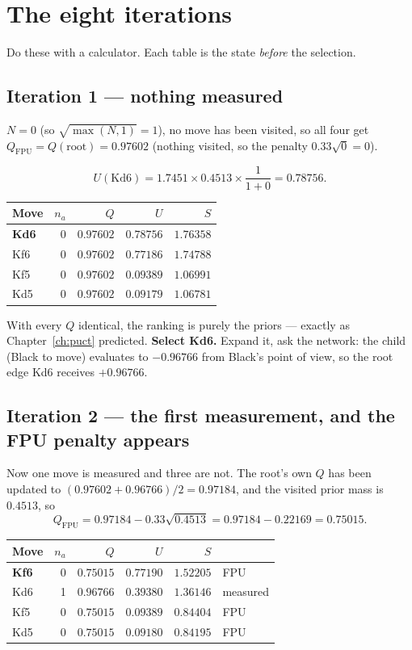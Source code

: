 \section{The eight iterations}

Do these with a calculator. Each table is the state \emph{before} the selection.

\subsection*{Iteration 1 --- nothing measured}

$N = 0$ (so $\sqrt{\max(N,1)} = 1$), no move has been visited, so all four get
$Q_{\text{FPU}} = Q(\text{root}) = 0.97602$ (nothing visited, so the penalty
$0.33\sqrt{0} = 0$).

\[
  U(\text{Kd6}) = 1.7451 \times 0.4513 \times \frac{1}{1+0} = 0.78756 .
\]

\begin{center}
\begin{tabular}{@{}lrrrr@{}}
\toprule
Move & $n_a$ & $Q$ & $U$ & $S$ \\
\midrule
\textbf{Kd6} & 0 & $0.97602$ & $0.78756$ & $\mathbf{1.76358}$ \\
Kf6 & 0 & $0.97602$ & $0.77186$ & $1.74788$ \\
Kf5 & 0 & $0.97602$ & $0.09389$ & $1.06991$ \\
Kd5 & 0 & $0.97602$ & $0.09179$ & $1.06781$ \\
\bottomrule
\end{tabular}
\end{center}

With every $Q$ identical, the ranking is purely the priors --- exactly as
Chapter~\ref{ch:puct} predicted. \textbf{Select Kd6.} Expand it, ask the network:
the child (Black to move) evaluates to $-0.96766$ from Black's point of view, so the root
edge Kd6 receives $+0.96766$.

\subsection*{Iteration 2 --- the first measurement, and the FPU penalty appears}

Now one move is measured and three are not. The root's own $Q$ has been updated to
$(0.97602 + 0.96766)/2 = 0.97184$, and the visited prior mass is $0.4513$, so
\[
Q_{\text{FPU}} = 0.97184 - 0.33\sqrt{0.4513} = 0.97184 - 0.22169 = 0.75015 .
\]

\begin{center}
\begin{tabular}{@{}lrrrrl@{}}
\toprule
Move & $n_a$ & $Q$ & $U$ & $S$ & \\
\midrule
\textbf{Kf6} & 0 & $0.75015$ & $0.77190$ & $\mathbf{1.52205}$ & FPU \\
Kd6 & 1 & $0.96766$ & $0.39380$ & $1.36146$ & measured \\
Kf5 & 0 & $0.75015$ & $0.09389$ & $0.84404$ & FPU \\
Kd5 & 0 & $0.75015$ & $0.09180$ & $0.84195$ & FPU \\
\bottomrule
\end{tabular}
\end{center}

